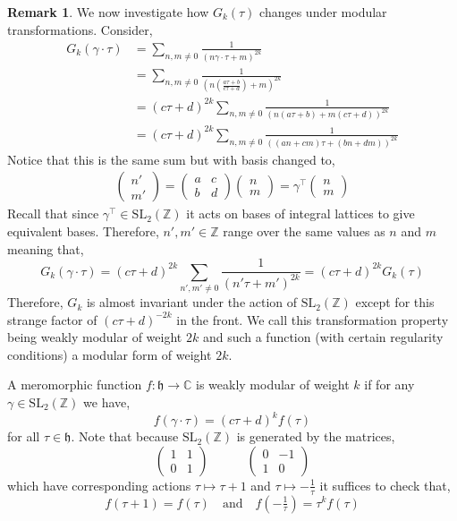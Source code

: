 \documentclass{article}
\newcommand{\SL}[0]{\mathrm{SL}}
\newcommand{\Z}{\mathbb{Z}}
\newcommand{\C}{\mathbb{C}}
\theoremstyle{definition}
\newtheorem{remark}{Remark}[section]
\newenvironment{definition}[1][Definition:]{\begin{trivlist}
\item[\hskip \labelsep {\bfseries #1}]}{\end{trivlist}}
\newcommand{\h}{\mathfrak{h}}
\newcommand{\MG}{\SL_2(\Z)}
\begin{document}
\begin{remark}
We now investigate how $G_k(\tau)$ changes under modular transformations. Consider,
\begin{align*}
G_k(\gamma \cdot \tau) & = \sum_{n,m \neq 0} \frac{1}{(n \gamma \cdot \tau + m)^{2k}} 
\\
& = \sum_{n,m \neq 0} \frac{1}{(n \left( \frac{a \tau + b}{c \tau + d} \right) + m)^{2k}} 
\\
& = (c \tau + d)^{2k} \sum_{n,m \neq 0} \frac{1}{(n (a \tau + b) + m (c \tau + d))^{2k}} 
\\
& = (c \tau + d)^{2k} \sum_{n,m \neq 0} \frac{1}{((an + cm) \tau + (bn + dm)  )^{2k}} 
\end{align*}
Notice that this is the same sum but with basis changed to,
\begin{align*}
\begin{pmatrix}
n'
\\
m'
\end{pmatrix}
=
\begin{pmatrix}
a & c
\\
b & d 
\end{pmatrix}
\begin{pmatrix}
n
\\
m
\end{pmatrix}
= \gamma^{\top} 
\begin{pmatrix}
n
\\
m
\end{pmatrix}
\end{align*}
Recall that since $\gamma^\top \in \MG$ it acts on bases of integral lattices to give equivalent bases. Therefore, $n',m' \in \Z$ range over the same values as $n$ and $m$ meaning that,
\[ G_k(\gamma \cdot \tau) = (c \tau + d)^{2k} \sum_{n',m' \neq 0} \frac{1}{(n' \tau + m')^{2k}} = (c \tau + d)^{2k} G_k(\tau) \]
Therefore, $G_k$ is almost invariant under the action of $\MG$ except for this strange factor of $(c \tau + d)^{-2k}$ in the front. We call this transformation property being weakly modular of weight $2k$ and such a function (with certain regularity conditions) a modular form of weight $2k$.
\end{remark}

\begin{definition}
A meromorphic function $f : \h \to \C$ is weakly modular of weight $k$ if for any $\gamma \in \MG$ we have,
\[ f(\gamma \cdot \tau) = (c \tau + d)^k f(\tau) \]
for all $\tau \in \h$. Note that because $\MG$ is generated by the matrices,
\[ \begin{pmatrix}
1 & 1 
\\
0 & 1
\end{pmatrix}
\quad \quad \quad
\begin{pmatrix}
0 & -1 
\\
1 & 0
\end{pmatrix} \]
which have corresponding actions $\tau \mapsto \tau + 1$ and $\tau \mapsto - \frac{1}{\tau}$ it suffices to check that,
\[ f(\tau + 1) = f(\tau) \quad \text{and} \quad f\left( - \tfrac{1}{\tau} \right) = \tau^k f(\tau) \]
\end{definition}
\end{document}
